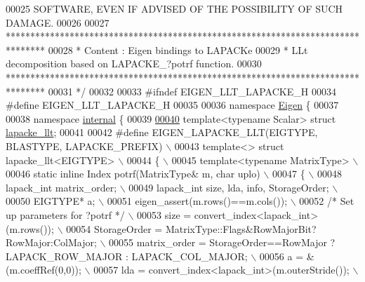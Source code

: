 \begin{DoxyCode}
00025 \textcolor{comment}{ SOFTWARE, EVEN IF ADVISED OF THE POSSIBILITY OF SUCH DAMAGE.}
00026 \textcolor{comment}{}
00027 \textcolor{comment}{ ********************************************************************************}
00028 \textcolor{comment}{ *   Content : Eigen bindings to LAPACKe}
00029 \textcolor{comment}{ *     LLt decomposition based on LAPACKE\_?potrf function.}
00030 \textcolor{comment}{ ********************************************************************************}
00031 \textcolor{comment}{*/}
00032 
00033 \textcolor{preprocessor}{#ifndef EIGEN\_LLT\_LAPACKE\_H}
00034 \textcolor{preprocessor}{#define EIGEN\_LLT\_LAPACKE\_H}
00035 
00036 \textcolor{keyword}{namespace }\hyperlink{namespace_eigen}{Eigen} \{ 
00037 
00038 \textcolor{keyword}{namespace }\hyperlink{namespaceinternal}{internal} \{
00039 
\hyperlink{struct_eigen_1_1internal_1_1lapacke__llt}{00040} \textcolor{keyword}{template}<\textcolor{keyword}{typename} Scalar> \textcolor{keyword}{struct }\hyperlink{struct_eigen_1_1internal_1_1lapacke__llt}{lapacke\_llt};
00041 
00042 \textcolor{preprocessor}{#define EIGEN\_LAPACKE\_LLT(EIGTYPE, BLASTYPE, LAPACKE\_PREFIX) \(\backslash\)}
00043 \textcolor{preprocessor}{template<> struct lapacke\_llt<EIGTYPE> \(\backslash\)}
00044 \textcolor{preprocessor}{\{ \(\backslash\)}
00045 \textcolor{preprocessor}{  template<typename MatrixType> \(\backslash\)}
00046 \textcolor{preprocessor}{  static inline Index potrf(MatrixType& m, char uplo) \(\backslash\)}
00047 \textcolor{preprocessor}{  \{ \(\backslash\)}
00048 \textcolor{preprocessor}{    lapack\_int matrix\_order; \(\backslash\)}
00049 \textcolor{preprocessor}{    lapack\_int size, lda, info, StorageOrder; \(\backslash\)}
00050 \textcolor{preprocessor}{    EIGTYPE* a; \(\backslash\)}
00051 \textcolor{preprocessor}{    eigen\_assert(m.rows()==m.cols()); \(\backslash\)}
00052 \textcolor{preprocessor}{    }\textcolor{comment}{/* Set up parameters for ?potrf */}\textcolor{preprocessor}{ \(\backslash\)}
00053 \textcolor{preprocessor}{    size = convert\_index<lapack\_int>(m.rows()); \(\backslash\)}
00054 \textcolor{preprocessor}{    StorageOrder = MatrixType::Flags&RowMajorBit?RowMajor:ColMajor; \(\backslash\)}
00055 \textcolor{preprocessor}{    matrix\_order = StorageOrder==RowMajor ? LAPACK\_ROW\_MAJOR : LAPACK\_COL\_MAJOR; \(\backslash\)}
00056 \textcolor{preprocessor}{    a = &(m.coeffRef(0,0)); \(\backslash\)}
00057 \textcolor{preprocessor}{    lda = convert\_index<lapack\_int>(m.outerStride()); \(\backslash\)}

\end{DoxyCode}
